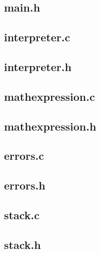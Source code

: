 \documentclass[a4paper,14pt]{extarticle}
\begin{document}
\subsection{main.h}

\subsection{interpreter.c}

\subsection{interpreter.h}

\subsection{mathexpression.c}

\subsection{mathexpression.h}

\subsection{errors.c}

\subsection{errors.h}

\subsection{stack.c}

\subsection{stack.h}
\end{document}
